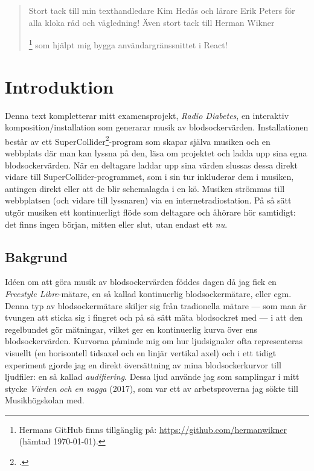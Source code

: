 \documentclass[11pt, a4paper]{article} %
\newcommand{\symfootnote}[1]{%
\let\oldthefootnote=\thefootnote%
\stepcounter{mpfootnote}%
\addtocounter{footnote}{-1}%
\renewcommand{\thefootnote}{$\dagger$}%
\footnote{#1}%
\let\thefootnote=\oldthefootnote%
}
\begin{document}
\clearpage


\newpage

\renewcommand{\abstractname}{Tack}
\begin{abstract}
  Stort tack till min texthandledare Kim Hedås och lärare Erik Peters för alla kloka råd och vägledning! Även stort tack till Herman Wikner\symfootnote{Hermans GitHub finns tillgänglig på: \url{https://github.com/hermanwikner} (hämtad \today).} som hjälpt mig bygga användargränssnittet i React! 
\end{abstract}
\tableofcontents

\section*{Introduktion}
Denna text kompletterar mitt examensprojekt, \emph{Radio Diabetes}, en interaktiv komposition/installation som generarar musik av blodsockervärden. Installationen består av ett SuperCollider\footcite{noauthor_supercollider_nodate}-program som skapar själva musiken och en webbplats där man kan lyssna på den, läsa om projektet och ladda upp sina egna blodsockervärden. När en deltagare laddar upp sina värden slussas dessa direkt vidare till SuperCollider-programmet, som i sin tur inkluderar dem i musiken, antingen direkt eller att de blir schemalagda i en kö. Musiken strömmas till webbplatsen (och vidare till lyssnaren) via en internetradiostation. På så sätt utgör musiken ett kontinuerligt flöde som deltagare och åhörare hör samtidigt: det finns ingen början, mitten eller slut, utan endast ett \emph{nu}. %



\subsection*{Bakgrund}
Idéen om att göra musik av blodsockervärden föddes dagen då jag fick en \emph{Freestyle Libre}-mätare, en så kallad kontinuerlig blodsockermätare, eller \gls{cgm}. Denna typ av blodsockermätare skiljer sig från tradionella mätare --- som man är tvungen att sticka sig i fingret och på så sätt mäta blodsockret med --- i att den regelbundet gör mätningar, vilket ger en kontinuerlig kurva över ens blodsockervärden. Kurvorna påminde mig om hur ljudsignaler ofta representeras visuellt (en horisontell tidsaxel och en linjär vertikal axel) och i ett tidigt experiment gjorde jag en direkt översättning av mina blodsockerkurvor till ljudfiler: en så kallad \emph{audifiering}. Dessa ljud använde jag som samplingar i mitt stycke \emph{Värden och en vagga} (2017), som var ett av arbetsproverna jag sökte till Musikhögskolan med. 
\end{document}
